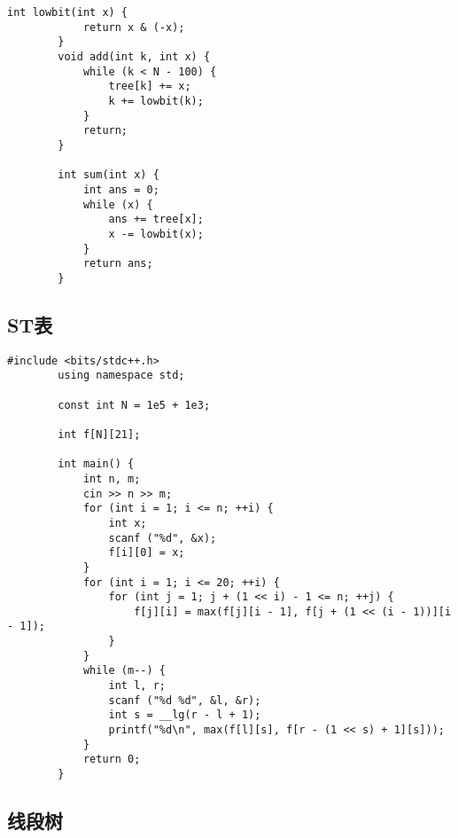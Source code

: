 \documentclass[12pt, a4paper]{ctexart}
\begin{document}
	\begin{lstlisting}[caption={}]
		int lowbit(int x) {
			return x & (-x);
		}
		void add(int k, int x) {
			while (k < N - 100) {
				tree[k] += x;
				k += lowbit(k);
			}
			return;
		}
		
		int sum(int x) {
			int ans = 0;
			while (x) {
				ans += tree[x];
				x -= lowbit(x);
			}
			return ans;
		}
	\end{lstlisting}
	\subsection{ST表}
	\begin{lstlisting}[caption={}]
		#include <bits/stdc++.h>
		using namespace std;
		
		const int N = 1e5 + 1e3;
		
		int f[N][21];
		
		int main() {
			int n, m;
			cin >> n >> m;
			for (int i = 1; i <= n; ++i) {
				int x;
				scanf ("%d", &x);
				f[i][0] = x;
			}
			for (int i = 1; i <= 20; ++i) {
				for (int j = 1; j + (1 << i) - 1 <= n; ++j) {
					f[j][i] = max(f[j][i - 1], f[j + (1 << (i - 1))][i - 1]);
				}
			}
			while (m--) {
				int l, r;
				scanf ("%d %d", &l, &r);
				int s = __lg(r - l + 1);
				printf("%d\n", max(f[l][s], f[r - (1 << s) + 1][s]));
			}
			return 0;
		}
	\end{lstlisting}
	\subsection{线段树}
\end{document}
